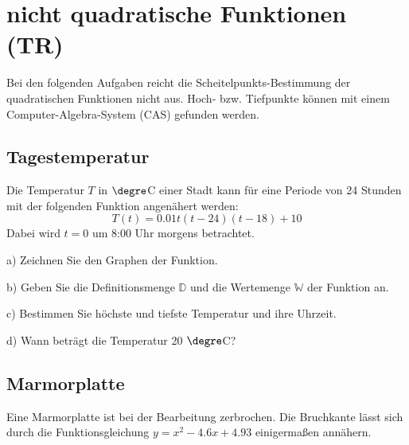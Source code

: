 \section{nicht quadratische Funktionen (TR)}
Bei den folgenden Aufgaben reicht die Scheitelpunkts-Bestimmung der
quadratischen Funktionen nicht aus. Hoch- bzw. Tiefpunkte können mit
einem Computer-Algebra-System (CAS) gefunden werden.
\subsection{Tagestemperatur}

Die Temperatur $T$ in $\degre$C einer Stadt kann für eine Periode von 24 Stunden mit der folgenden Funktion
angenähert werden:
 $$T(t) = 0.01t(t-24)(t-18)+10$$
 Dabei wird $t=0$ um 8:00 Uhr morgens betrachtet.

a)
Zeichnen Sie den Graphen der Funktion.

b) 
Geben Sie die Definitionsmenge $\mathbb{D}$ und die Wertemenge
$\mathbb{W}$ der Funktion an.

c)
Bestimmen Sie höchste und tiefste Temperatur und ihre Uhrzeit.

d)
Wann beträgt die Temperatur 20 $\degre$C?

\subsection{Marmorplatte}

Eine Marmorplatte ist bei der Bearbeitung zerbrochen. Die Bruchkante lässt sich durch die Funktionsgleichung $y=x^2 - 4.6x + 4.93$ einigermaßen annähern.

